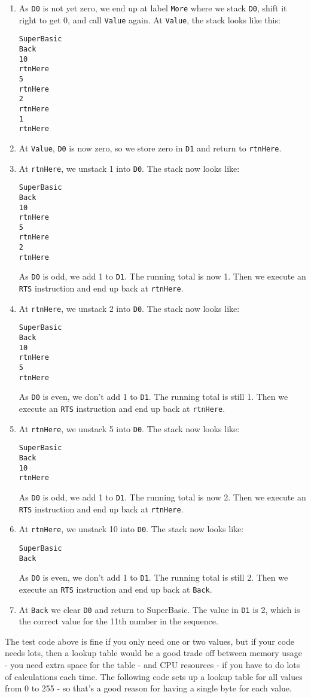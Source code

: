 \begin{enumerate}
\item As \lstinline!D0! is not yet zero, we end up at label \lstinline!More!
where we stack \lstinline!D0!, shift it right to get 0, and call
\lstinline!Value! again. At \lstinline!Value!, the stack looks like
this: 
\begin{lstlisting}[numbers=none]
SuperBasic
Back
10
rtnHere
5
rtnHere
2
rtnHere
1
rtnHere
\end{lstlisting}
\item At \lstinline!Value!, \lstinline!D0! is now zero, so we store zero
in \lstinline!D1! and return to \lstinline!rtnHere!.
\item At \lstinline!rtnHere!, we unstack 1 into \lstinline!D0!. The stack
now looks like:
\begin{lstlisting}[numbers=none]
SuperBasic
Back
10
rtnHere
5
rtnHere
2
rtnHere
\end{lstlisting}
As \lstinline!D0! is odd, we add 1 to \lstinline!D1!. The running
total is now 1. Then we execute an \lstinline!RTS! instruction and
end up back at \lstinline!rtnHere!.
\item At \lstinline!rtnHere!, we unstack 2 into \lstinline!D0!. The stack
now looks like:
\begin{lstlisting}[numbers=none]
SuperBasic
Back
10
rtnHere
5
rtnHere
\end{lstlisting}
 As \lstinline!D0! is even, we don't add 1 to \lstinline!D1!. The
running total is still 1. Then we execute an \lstinline!RTS! instruction
and end up back at \lstinline!rtnHere!.
\item At \lstinline!rtnHere!, we unstack 5 into \lstinline!D0!. The stack
now looks like:
\begin{lstlisting}[numbers=none]
SuperBasic
Back
10
rtnHere
\end{lstlisting}
As \lstinline!D0! is odd, we add 1 to \lstinline!D1!. The running
total is now 2. Then we execute an \lstinline!RTS! instruction and
end up back at \lstinline!rtnHere!.
\item At \lstinline!rtnHere!, we unstack 10 into \lstinline!D0!. The stack
now looks like:
\begin{lstlisting}[numbers=none]
SuperBasic
Back
\end{lstlisting}
 As \lstinline!D0! is even, we don't add 1 to \lstinline!D1!. The
running total is still 2. Then we execute an \lstinline!RTS! instruction
and end up back at \lstinline!Back!.
\item At \lstinline!Back! we clear \lstinline!D0! and return to SuperBasic.
The value in \lstinline!D1! is 2, which is the correct value for
the 11th number in the sequence. 
\end{enumerate}
The test code above is fine if you only need one or two values, but
if your code needs lots, then a lookup table would be a good trade
off between memory usage - you need extra space for the table - and
CPU resources - if you have to do lots of calculations each time.
The following code sets up a lookup table for all values from 0 to
255 - so that's a good reason for having a single byte for each value.

